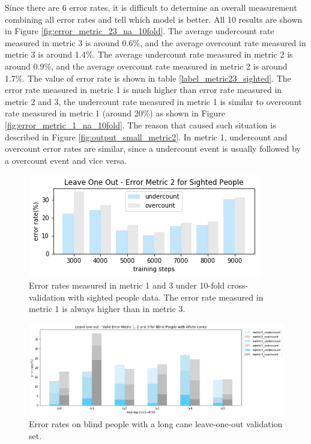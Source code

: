 \documentclass[11pt]{article}
\begin{document}
{Since there are 6 error rates, it is difficult to determine an overall measurement combining all error rates and tell which model is better. All 10 results are shown in Figure \ref{fig:error_metric_23_na_10fold}.
The average undercount rate measured in metric 3 is around 0.6\%, and the average overcount rate measured in  metric 3 is around 1.4\%.  
The average undercount rate measured in  metric 2 is around 0.9\%, and the average overcount rate measured in metric 2 is around 1.7\%.  
The value of error rate is shown in table \ref{label_metric23_sighted}. The error rate measured in metric 1 is much higher than error rate measured in metric 2 and 3, the undercount rate measured in metric 1 is similar to overcount rate measured in metric 1 (around 20\%) as shown in Figure \ref{fig:error_metric_1_na_10fold}. The reason that caused such situation is described in Figure \ref{fig:output_small_metric2}. In metric 1, undercount and overcount error rates are similar, since a undercount event is usually followed by a overcount event and vice versa.

\begin{figure}[ht]
\centering
\includegraphics[scale=0.55]{error_metric_2_na_step}
\caption{Error rates measured in metric 1 and 3 under 10-fold cross-validation with sighted people data. The error rate measured in metric 1 is always higher than in metric 3.}
\label{fig:error_metric_2_na_step}
\end{figure}


\begin{figure}[ht]
\centering
\includegraphics[scale=0.5]{error_metric_wc_10fold_valid4000}
\caption{Error rates on blind people with a long cane leave-one-out validation set.}
\label{fig:error_metric_wc_10fold_valid4000}
\end{figure}


}
\end{document}
